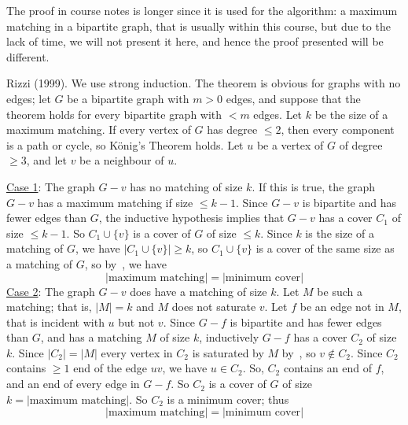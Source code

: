 The proof in course notes is longer since it is used for the algorithm:
a maximum matching in a bipartite graph, that is usually within this course,
but due to the lack of time, we will not present it here, and hence the proof presented
will be different.
\begin{Proof}{}{}
    Rizzi (1999). We use strong induction.
    The theorem is obvious for graphs with no edges; let $ G $
    be a bipartite graph with $ m>0 $ edges, and suppose that the theorem holds
    for every bipartite graph with $ <m $ edges. Let $ k $ be the size of a
    maximum matching. If every vertex of $ G $ has degree $ \leqslant 2 $, then every
    component is a path or cycle, so König's Theorem holds. Let $ u $ be a vertex of
    $ G $ of degree $ \geqslant 3 $, and let $ v $ be a neighbour of $ u $.

    \underline{Case 1}: The graph $ G-v $ has no matching of size $ k $. If this is true,
    the graph $ G-v $ has a maximum matching if size $ \leqslant k-1 $. Since $ G-v $
    is bipartite and has fewer edges than $ G $, the inductive hypothesis implies that
    $ G-v $ has a cover $ C_1 $ of size $ \leqslant k-1 $. So $ C_1\cup \{v\} $
    is a cover of $ G $ of size $ \leqslant k $. Since $ k $ is the size of a matching of
    $ G $, we have $ |C_1\cup \{v\}|\geqslant k $, so $ C_1 \cup \{v\} $ is a cover
    of the same size as a matching of $ G $, so by~,
    we have
    \[ |\text{maximum matching}|=|\text{minimum cover}| \]
    \underline{Case 2}: The graph $ G-v $ does have a matching of size $ k $. Let
    $ M $ be such a matching; that is, $ |M|=k $ and $ M $ does not saturate $ v $.
    Let $ f $ be an edge not in $ M $, that is incident with $ u $ but not $ v $.
    Since $ G-f $ is bipartite and has fewer edges than $ G $, and has a matching $ M $
    of size $ k $, inductively $ G-f $ has a cover $ C_2 $ of size $ k $. Since
    $ |C_2|=|M| $ every vertex in $ C_2 $ is saturated by $ M $ by~,
    so $ v\notin C_2 $. Since $ C_2 $ contains $ \geqslant 1 $ end of the edge $ uv $,
    we have $ u\in C_2 $. So, $ C_2 $ contains an end of $ f $, and an end of every edge in
    $ G-f $. So $ C_2 $ is a cover of $ G $ of size $ k = |\text{maximum matching}| $.
    So $ C_2 $ is a minimum cover; thus
    \[ |\text{maximum matching}|=|\text{minimum cover}| \]
\end{Proof}
